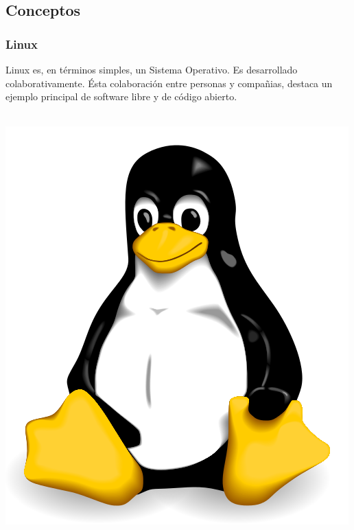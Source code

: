 \documentclass[9pt,t]{beamer}
\begin{document}
\subsection{Conceptos}
\begin{frame}\justifying
  \frametitle{Linux}
  Linux es, en términos simples, un Sistema Operativo. Es desarrollado colaborativamente. Ésta colaboración entre personas
  y compañias, destaca un ejemplo principal de software libre y de código abierto.
  \ \\ \ \\ 
  \begin{center}
    \includegraphics[height=0.27\textheight]{images/03_tux500.png} \hspace*{0.0cm}
  \end{center}
\end{frame}
\end{document}
